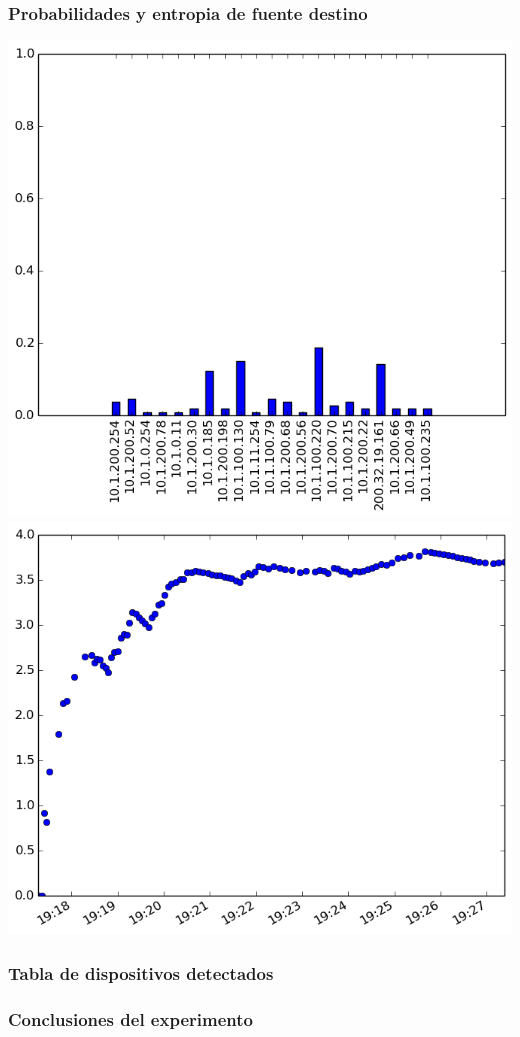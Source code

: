 \subsubsection{Probabilidades y entropia de fuente destino}
\includegraphics[scale=0.33]{../experimentacion-svilerino/labo-entrepisodc/histogram_dst_probabilities.png}
\includegraphics[scale=0.33]{../experimentacion-svilerino/labo-entrepisodc/entropy_dst.png}

\subsubsection{Tabla de dispositivos detectados}


\subsubsection{Conclusiones del experimento}